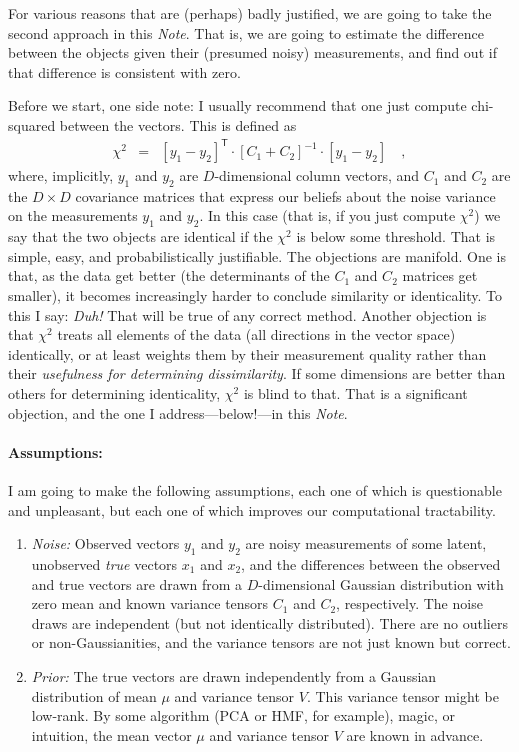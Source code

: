 \documentclass[12pt,letterpaper]{article}
\newcommand{\documentname}{\textsl{Note}}
\newcommand{\transpose}[1]{{#1}^{\mathsf{T}}}
\newcommand{\inverse}[1]{{#1}^{-1}}
\begin{document}
For various reasons that are (perhaps) badly justified, we are going
to take the second approach in this \documentname. That is, we are
going to estimate the difference between the objects given their
(presumed noisy) measurements, and find out if that difference is
consistent with zero.

Before we start, one side note: I usually recommend that one just
compute chi-squared between the vectors. This is defined as
\begin{eqnarray}
\chi^2 &=&
\transpose{[y_1 - y_2]}\cdot\inverse{[C_1 + C_2]}\cdot [y_1 - y_2] \quad ,
\label{eq:chisquared}
\end{eqnarray}
where, implicitly, $y_1$ and $y_2$ are $D$-dimensional column vectors,
and $C_1$ and $C_2$ are the $D\times D$ covariance matrices that
express our beliefs about the noise variance on the measurements $y_1$
and $y_2$. In this case (that is, if you just compute $\chi^2$) we say
that the two objects are identical if the $\chi^2$ is below some
threshold. That is simple, easy, and probabilistically
justifiable. The objections are manifold. One is that, as the data get
better (the determinants of the $C_1$ and $C_2$ matrices get smaller),
it becomes increasingly harder to conclude similarity or
identicality. To this I say: \emph{Duh!} That will be true of any
correct method. Another objection is that $\chi^2$ treats all elements
of the data (all directions in the vector space) identically, or at
least weights them by their measurement quality rather than their
\emph{usefulness for determining dissimilarity}. If some dimensions
are better than others for determining identicality, $\chi^2$ is blind
to that. That is a significant objection, and the one I
address---below!---in this \documentname.

\paragraph{Assumptions:}
I am going to make the following assumptions, each one of which is
questionable and unpleasant, but each one of which improves our
computational tractability.
\begin{enumerate}\itemsep0ex
\item \emph{Noise:} Observed vectors $y_1$ and $y_2$ are noisy
  measurements of some latent, unobserved \emph{true} vectors $x_1$
  and $x_2$, and the differences between the observed and true vectors
  are drawn from a $D$-dimensional Gaussian distribution with zero
  mean and known variance tensors $C_1$ and $C_2$, respectively. The
  noise draws are independent (but not identically distributed). There
  are no outliers or non-Gaussianities, and the variance tensors are
  not just known but correct.
\item \emph{Prior:} The true vectors are drawn independently from a
  Gaussian distribution of mean $\mu$ and variance tensor $V$. This
  variance tensor might be low-rank. By some algorithm (PCA or HMF,
  for example), magic, or intuition, the mean vector $\mu$ and
  variance tensor $V$ are known in advance.
\end{enumerate}
\end{document}
